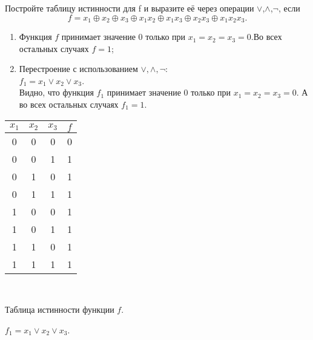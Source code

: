 \begin{exercise}
Постройте таблицу истинности для f и выразите её через операции $\vee$,$\wedge$,$\neg$, если
\begin{equation}
		f=x_1\oplus x_2\oplus x_3\oplus x_1x_2\oplus x_1x_3\oplus x_2x_3\oplus 			x_1x_2x_3.
\end{equation}

\end{exercise}

\begin{solution}
\begin{paracol}{2}
\noindent
\begin{enumerate}
	\item Функция $f$ принимает значение $0$ только при $x_1=x_2=x_3=0$.Во всех остальных случаях $f=1$;
	\item  Перестроение с использованием $\vee, \wedge, \neg$:\\
	$f_1=x_1\vee x_2\vee x_3$.\\
	Видно, что функция  $f_1$ принимает значение $0$ только при $x_1=x_2=x_3=0$. А во всех остальных случаях $f_1=1$.
\end{enumerate}
\switchcolumn
\begin{center}
 \begin{tabular}{| c c c | c |}
  \hline	
 $ x_1$ & $x_2$ & $x_3$ & $f$ \T\B \\
  \hline\hline
  0 & 0 & 0 & 0\T\B \\
  0 & 0 & 1 & 1 \B \\
  0 & 1 & 0 & 1 \B \\
  0 & 1 & 1 & 1 \B \\
  1 & 0 & 0 & 1 \B \\
  1 & 0 & 1 & 1 \B \\
  1 & 1 & 0 & 1 \B \\
  1 & 1 & 1 & 1 \B \\
  \hline
 \end{tabular}
 \vspace{1 cm}
 \
 
 \small Таблица истинности функции $f$.
 \end{center}
\end{paracol}
\end{solution}

\begin{answer}
$f_1=x_1\vee x_2\vee x_3$.
\end{answer}